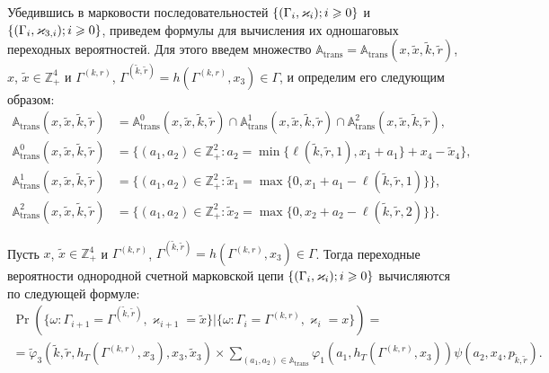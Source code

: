 \documentclass{report}
\newcommand{\Mark}{\{(\Gamma_i, \varkappa_i); \hm{} i \geqslant 0\}}
\newcommand{\MarkThree}{\{(\Gamma_i, \varkappa_{3,i}); \hm{} i \geqslant 0\}}
\begin{document}
Убедившись в марковости последовательностей $\Mark$ и $\MarkThree$, приведем формулы для вычисления их одношаговых переходных вероятностей. Для этого введем множество ${\mathbb A}_{\mathrm{trans}} = {\mathbb A}_{\mathrm{trans}}(x,\tilde{x},\tilde{k},\tilde{r})$, $x$, $\tilde{x}\in \mathbb{Z}_+^4$ и $\Gamma^{(k,r)}$, $\Gamma^{(\tilde{k},\tilde{r})}=h(\Gamma^{(k,r)},x_3) \in \Gamma$,  и определим его следующим образом:
\begin{align}
{\mathbb A}_{\mathrm{trans}}(x,\tilde{x},\tilde{k},\tilde{r}) &= {\mathbb A}_{\mathrm{trans}}^0(x,\tilde{x},\tilde{k},\tilde{r}) \cap {\mathbb A}_{\mathrm{trans}}^1(x,\tilde{x},\tilde{k},\tilde{r})\cap {\mathbb A}_{\mathrm{trans}}^2(x,\tilde{x},\tilde{k},\tilde{r}),\label{A:trans:1}\\
{\mathbb A}_{\mathrm{trans}}^0(x,\tilde{x},\tilde{k},\tilde{r}) &= \{(a_1,a_2) \in \mathbb{Z}_+^2 \colon a_2 = \min{\{\ell(\tilde{k},\tilde{r},1), x_1+a_1}\} +x_4-\tilde{x}_4\},\\
{\mathbb A}_{\mathrm{trans}}^1(x,\tilde{x},\tilde{k},\tilde{r}) &= \{(a_1,a_2) \in \mathbb{Z}_+^2 \colon \tilde{x}_1=\max{\{0,x_1+a_1-\ell(\tilde{k},\tilde{r},1)\}}\},\\
{\mathbb A}_{\mathrm{trans}}^2(x,\tilde{x},\tilde{k},\tilde{r}) &= \{(a_1,a_2) \in \mathbb{Z}_+^2 \colon  \tilde{x}_2=\max{\{0,x_2+a_2-\ell(\tilde{k},\tilde{r},2)\}}\}.\label{A:trans:2}
\end{align}
\begin{theorem}
Пусть $x$, $\tilde{x}\in \mathbb{Z}_+^4$ и $\Gamma^{(k,r)}$, $\Gamma^{(\tilde{k},\tilde{r})}=h(\Gamma^{(k,r)},x_3) \in \Gamma$. Тогда переходные вероятности однородной счетной марковской цепи $\Mark$ вычисляются по следующей формуле:
\begin{multline}
\Pr (\{\omega\colon \Gamma_{i+1}=\Gamma^{(\tilde{k},\tilde{r})},\varkappa_{i+1}=\tilde{x} \}| \{\omega\colon \Gamma_{i}=\Gamma^{(k,r)},\varkappa_i=x\})=\\ 
=\widetilde{\varphi}_3(\tilde{k},\tilde{r},h_T(\Gamma^{(k,r)},x_3),x_3,\tilde{x}_3)\times
\sum_{(a_1,a_2)\in {\mathbb A}_{\mathrm{trans}}}\varphi_1(a_1,h_T(\Gamma^{(k,r)},x_3))  \psi(a_2,x_4, p_{\tilde{k},\tilde{r}}).
\label{transitionToProve}
\end{multline}
\end{theorem}
\end{document}
